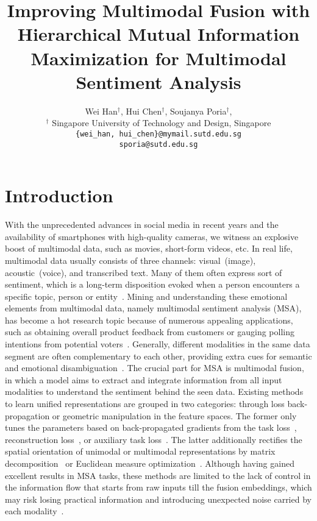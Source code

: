 \documentclass[11pt]{article}
\title{Improving Multimodal Fusion with Hierarchical Mutual Information Maximization for Multimodal Sentiment Analysis}
\author{Wei Han$^\dagger$, Hui Chen$^\dagger$, Soujanya Poria$^\dagger$,\\
  $^\dagger$ Singapore University of Technology and Design, Singapore\\
  \texttt{\{wei\_han, hui\_chen\}@mymail.sutd.edu.sg}\\
  \texttt{sporia@sutd.edu.sg}\\
  }
\newcommand{\mv}{visual}
\newcommand{\ma}{acoustic}
\begin{document}
\maketitle



\section{Introduction}
With the unprecedented advances in social media in recent years and the availability of smartphones with high-quality cameras, we witness an explosive boost of multimodal data, such as movies, short-form videos, etc.
In real life, multimodal data usually consists of three channels: \mv~(image), \ma~(voice), and transcribed text. 
Many of them often express sort of sentiment, which is a long-term disposition evoked when a person encounters a specific topic, person or entity~\citep{deonna2012emotions,poria2020beneath}.
Mining and understanding these emotional elements from multimodal data, namely multimodal sentiment analysis (MSA), has become a hot research topic because of numerous appealing applications, such as obtaining overall product feedback from customers or gauging polling intentions from potential voters~\citep{melville2009sentiment}. 
Generally, different modalities in the same data segment are often complementary to each other, providing extra cues for semantic and emotional disambiguation~\citep{ngiam2011multimodal}. 
The crucial part for MSA is multimodal fusion, in which a model aims to extract and integrate information from all input modalities to understand the sentiment behind the seen data.
Existing methods to learn unified representations are grouped
in two categories: through loss back-propagation or geometric manipulation in the feature spaces.
The former only tunes the parameters based on back-propagated gradients from the task loss~\citep{zadeh2017tensor, tsai2019multimodal, ghosal-etal-2019-dialoguegcn}, reconstruction loss~\citep{mai2020modality}, or auxiliary task loss~\citep{chen2017multimodal,yu2021learning}.
The latter additionally rectifies the spatial orientation of unimodal or multimodal representations by matrix decomposition~\citep{liu2018efficient} or Euclidean measure optimization~\citep{sun2020learning, hazarika2020misa}.
Although having gained excellent results in MSA tasks, these methods are limited to the lack of control in the information flow 
that starts from raw inputs till the fusion embeddings, which may risk losing practical information and introducing unexpected noise carried by each modality~\cite{tsai2020multimodal}. 
\end{document}
